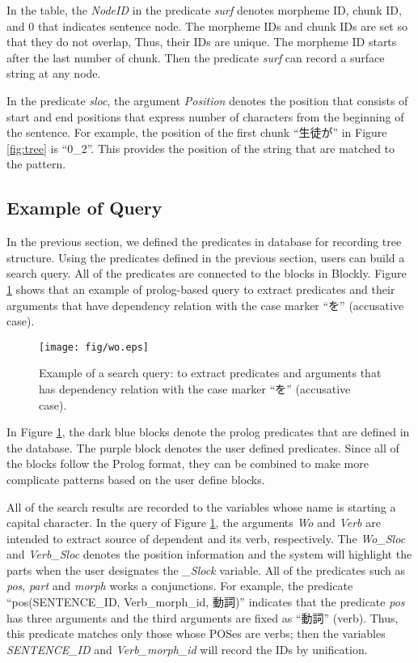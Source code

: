 \documentclass[conference]{IEEEtran}
\begin{document}
In the table, the {\it NodeID} in the predicate {\it surf} denotes
morpheme ID, chunk ID, and 0 that indicates sentence node.
The morpheme IDs and chunk IDs are set so that they do not overlap,
Thus, their IDs are unique. The morpheme ID starts after the last number
of chunk. Then the predicate {\it surf} can
record a surface string at any node.

In the predicate {\it sloc}, the argument {\it Position} denotes
the position that consists of start and end positions that express number of characters
from the beginning of the sentence.
For example, the position of the first chunk ``生徒が'' in Figure \ref{fig:tree}
is ``0\_2''. This provides the position of the string that are matched to the pattern.



\subsection{Example of Query}
\label{sec:example}
In the previous section, we defined the predicates in database for recording tree structure.
Using the predicates defined in the previous section,
users can build a search query. All of the predicates are connected to the blocks
in Blockly. Figure \ref{fig:pattern} shows that an example of prolog-based query to extract predicates and their arguments that have dependency relation with the case marker ``を'' (accusative case).

\begin{figure}[htbp]
  \centerline{\texttt{[image: fig/wo.eps]}}
  \caption{Example of a search query: to extract predicates and arguments that has dependency relation with the case marker ``を'' (accusative case).}
  \label{fig:pattern}
\end{figure}

In Figure \ref{fig:pattern}, the dark blue blocks denote the prolog predicates that are defined
in the database. The purple block denotes the user defined predicates. Since all of the blocks
follow the Prolog format, they can be combined to make more complicate patterns based on the user define blocks.

All of the search results are recorded to the variables whose name is starting a capital character.
In the query of Figure \ref{fig:pattern}, the arguments {\it Wo} and {\it Verb} are intended
to extract source of dependent and its verb, respectively.
The {\it Wo\_Sloc} and {\it Verb\_Sloc} denotes the position information and the system
will highlight the parts when the user designates the {\it \_Slock} variable.
All of the predicates such as {\it pos}, {\it part} and {\it morph} works a conjunctions.
For example, the predicate ``pos(SENTENCE\_ID, Verb\_morph\_id, 動詞)'' indicates that
the predicate {\it pos} has three arguments and the third arguments are fixed as ``動詞'' (verb).
Thus, this predicate matches only those whose POSes are verbs; then the variables
  {\it SENTENCE\_ID} and {\it Verb\_morph\_id} will record the IDs by unification.
\end{document}
